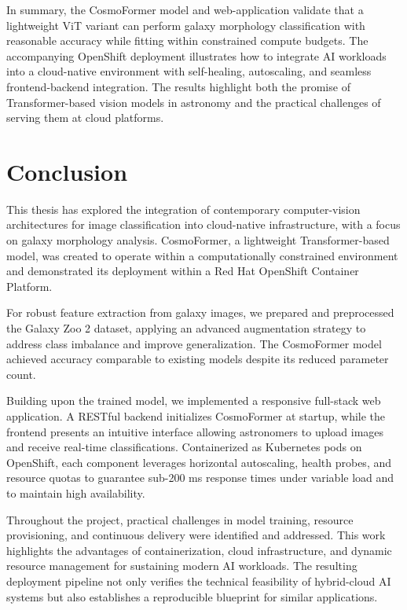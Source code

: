 In summary, the CosmoFormer model and web-application validate that a lightweight ViT variant can perform galaxy morphology classification with reasonable accuracy while fitting within constrained compute budgets. The accompanying OpenShift deployment illustrates how to integrate AI workloads into a cloud-native environment with self-healing, autoscaling, and seamless frontend-backend integration. The results highlight both the promise of Transformer-based vision models in astronomy and the practical challenges of serving them at cloud platforms.


\chapter{Conclusion}
This thesis has explored the integration of contemporary computer-vision architectures for image classification into cloud-native infrastructure, with a focus on galaxy morphology analysis. CosmoFormer, a lightweight Transformer-based model, was created to operate within a computationally constrained environment and demonstrated its deployment within a Red Hat OpenShift Container Platform.

For robust feature extraction from galaxy images, we prepared and preprocessed the Galaxy Zoo 2 dataset, applying an advanced augmentation strategy to address class imbalance and improve generalization. The CosmoFormer model achieved accuracy comparable to existing models despite its reduced parameter count.

Building upon the trained model, we implemented a responsive full-stack web application. A RESTful backend initializes CosmoFormer at startup, while the frontend presents an intuitive interface allowing astronomers to upload images and receive real-time classifications. Containerized as Kubernetes pods on OpenShift, each component leverages horizontal autoscaling, health probes, and resource quotas to guarantee sub-200 ms response times under variable load and to maintain high availability.

Throughout the project, practical challenges in model training, resource provisioning, and continuous delivery were identified and addressed. This work highlights the advantages of containerization, cloud infrastructure, and dynamic resource management for sustaining modern AI workloads. The resulting deployment pipeline not only verifies the technical feasibility of hybrid-cloud AI systems but also establishes a reproducible blueprint for similar applications.


